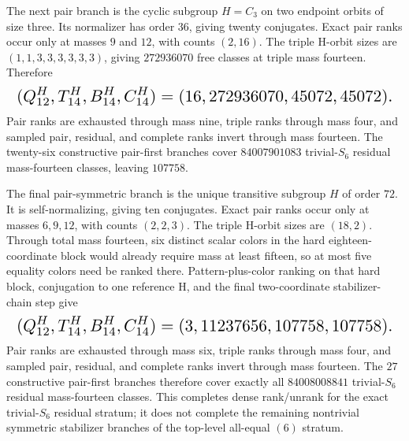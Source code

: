 \documentclass{article}
\newcommand{\fitmath}[1]{\resizebox{0.99\linewidth}{!}{$\displaystyle #1$}}
\begin{document}
The next pair branch is the cyclic subgroup $H=C_3$ on two endpoint orbits of
size three. Its normalizer has order $36$, giving twenty conjugates. Exact pair
ranks occur only at masses $9$ and $12$, with counts $(2,16)$. The triple
H-orbit sizes are $(1,1,3,3,3,3,3,3)$, giving $272936070$ free classes at
triple mass fourteen. Therefore
\begin{equation}
  \fitmath{%
    (Q^H_{12},T^H_{14},B^H_{14},C^H_{14})
      =(16,272936070,45072,45072).
  }
  \label{eq:optimization-crazy-sextuple-s6-pair-c3-33-ranking}
\end{equation}
Pair ranks are exhausted through mass nine, triple ranks through mass four, and
sampled pair, residual, and complete ranks invert through mass fourteen. The
twenty-six constructive pair-first branches cover $84007901083$ trivial-$S_6$
residual mass-fourteen classes, leaving $107758$.

The final pair-symmetric branch is the unique transitive subgroup $H$ of order
$72$. It is self-normalizing, giving ten conjugates. Exact pair ranks occur only
at masses $6,9,12$, with counts $(2,2,3)$. The triple H-orbit sizes are
$(18,2)$. Through total mass fourteen, six distinct scalar colors in the hard
eighteen-coordinate block would already require mass at least fifteen, so at
most five equality colors need be ranked there. Pattern-plus-color ranking on
that hard block, conjugation to one reference H, and the final two-coordinate
stabilizer-chain step give
\begin{equation}
  \fitmath{%
    (Q^H_{12},T^H_{14},B^H_{14},C^H_{14})
      =(3,11237656,107758,107758).
  }
  \label{eq:optimization-crazy-sextuple-s6-pair-transitive-order72-ranking}
\end{equation}
Pair ranks are exhausted through mass six, triple ranks through mass four, and
sampled pair, residual, and complete ranks invert through mass fourteen. The
$27$ constructive pair-first branches therefore cover exactly all
$84008008841$ trivial-$S_6$ residual mass-fourteen classes. This completes dense
rank/unrank for the exact trivial-$S_6$ residual stratum; it does not complete
the remaining nontrivial symmetric stabilizer branches of the top-level
all-equal $(6)$ stratum.
\end{document}

